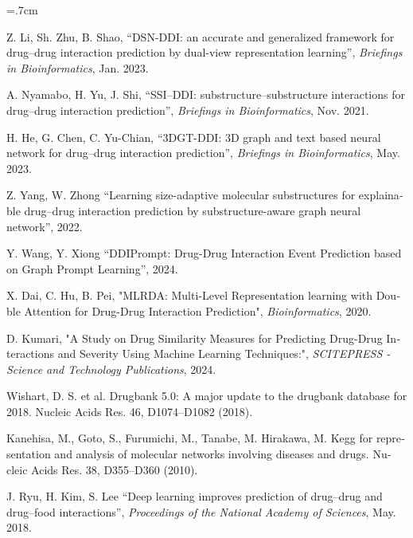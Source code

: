 \renewcommand{\bibname}{مراجع}

\begin{thebibliography}{99}

\begin{latin}

\baselineskip=.7cm

Z. Li, Sh. Zhu, B. Shao, “DSN-DDI: an accurate and generalized framework for drug–drug interaction prediction by dual-view representation learning”, \textit{Briefings in Bioinformatics}, Jan. 2023.

A. Nyamabo, H. Yu, J. Shi, “SSI–DDI: substructure–substructure interactions for drug–drug interaction prediction”, \textit{Briefings in Bioinformatics}, Nov. 2021.

H. He, G. Chen, C. Yu-Chian, “3DGT-DDI: 3D graph and text based neural network for drug–drug interaction prediction”, \textit{Briefings in Bioinformatics},  May. 2023.

Z. Yang, W. Zhong “Learning size-adaptive molecular substructures for explainable drug–drug interaction prediction by substructure-aware graph neural network”, 2022.

Y. Wang, Y. Xiong “DDIPrompt: Drug-Drug Interaction Event Prediction based on Graph Prompt Learning”, 2024.

X. Dai, C. Hu, B. Pei, "MLRDA: Multi-Level Representation learning with Double Attention for Drug-Drug Interaction Prediction", \textit{Bioinformatics}, 2020.

D. Kumari, "A Study on Drug Similarity Measures for Predicting Drug-Drug Interactions and Severity Using Machine Learning Techniques:", \textit{SCITEPRESS - Science and Technology Publications}, 2024.

Wishart, D. S. et al. Drugbank 5.0: A major update to the drugbank database for 2018. Nucleic Acids Res. 46, D1074–D1082 (2018).

Kanehisa, M., Goto, S., Furumichi, M., Tanabe, M. Hirakawa, M. Kegg for representation and analysis of molecular networks involving diseases and drugs. Nucleic Acids Res. 38, D355–D360 (2010).

J. Ryu, H. Kim, S. Lee “Deep learning improves prediction of drug–drug and drug–food interactions”, \textit{Proceedings of the National Academy of Sciences}, May. 2018.


\end{latin}
\end{thebibliography}

